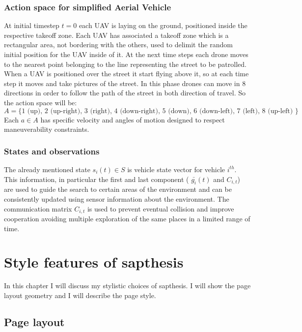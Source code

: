 \documentclass[LaM,binding=0.6cm]{sapthesis}
\begin{document}
\subsection*{Action space for simplified Aerial Vehicle}
At initial timestep $t=0$ each UAV is laying on the ground, positioned inside the respective takeoff zone. Each UAV has associated a takeoff zone which is a rectangular area, not bordering with the others, used to delimit the random initial position for the UAV inside of it.
At the next time steps each drone moves to the nearest point belonging to the line representing the street to be patrolled.
When a UAV is positioned over the street it start flying above it, so at each time step it moves and take pictures of the street. In this phase drones can move in 8 directions in order to follow the path of the street in both direction of travel. So the action space will be: 
$$ A = \{ 1 \mbox{ (up), }
2 \mbox{ (up-right), }
3 \mbox{ (right), } 
4 \mbox{ (down-right), }
5\mbox{ (down), }
6 \mbox{ (down-left), }
7 \mbox{ (left), } 
8 \mbox{ (up-left) }
\}$$
Each $a \in A$ has specific velocity and angles of motion designed to respect maneuverability constraints.

\subsection*{States and observations}
The already mentioned state $s_i(t) \in S$ is vehicle state vector for vehicle $i^{th}$. This
information, in particular the first and last component ( $\bar{g_i}(t)$ and $C_{i,t}$) are used to guide the search to certain areas of the
environment and can be consistently updated using sensor information about the environment. The communication matrix $C_{i,t}$ is used to prevent eventual collision and improve cooperation avoiding multiple exploration of the same places in a limited range of time.


\mainmatter

\chapter{Style features of \textsf{sapthesis}}

In this chapter I will discuss my stylistic choices of \textsf{sapthesis}.
I will show the page layout geometry and I will describe the page style.

\section{Page layout}
\end{document}
